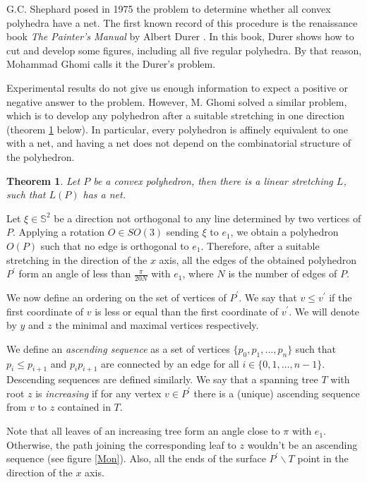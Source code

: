 \documentclass[openright, 12pt]{article}
\newtheorem{teorema}{Theorem}
\begin{document}
G.C. Shephard \cite{Sh} posed in 1975 the problem to determine whether all convex polyhedra have a net. The first known record of this procedure is the renaissance book \textit{The Painter's Manual} by Albert Durer \cite{Du}. In this book, Durer shows how to cut and develop some figures, including all five regular polyhedra. By that reason, Mohammad Ghomi \cite{Gh} calls it the Durer's problem.

Experimental results do not give us enough information to expect a positive or negative answer to the problem. However, M. Ghomi solved a similar problem, which is to develop any polyhedron after a suitable stretching in one direction (theorem \ref{Str} below). In particular, every polyhedron is affinely equivalent to one with a net, and having a net does not depend on the combinatorial structure of the polyhedron. 

\begin{teorema}\label{Str}
{\rm Let $P$ be a convex polyhedron, then there is a linear stretching $L$, such that $L(P)$ has a net.}
\end{teorema}



Let $\xi \in \mathbb{S}^2$ be a direction not orthogonal to any line determined by two vertices of $P$. Applying a rotation $O \in SO(3)$ sending $\xi $ to $e_1 $, we obtain a polyhedron $O(P)$ such that no edge is orthogonal to $e_1$. Therefore, after a suitable stretching in the direction of the $x$ axis, all the edges of the obtained polyhedron $P^{\prime}$  form an angle of less than $\frac{\pi}{20 N}$ with $e_1$, where $N$ is the number of edges of $P$.


We now define an ordering on the set of vertices of $P^{\prime}$. We say that $v \leq v^{\prime}$ if the first coordinate of $v$ is less or equal than the first coordinate of $v^{\prime}$. We will denote by $y$ and $z$ the minimal and maximal vertices respectively.

We define an \textit{ascending sequence} as a set of vertices $\{ p_0, p_1, \ldots , p_n   \}$ such that $p_i \leq p_{i+1}$ and $p_i p_{i+1}$ are connected by an edge for all $i \in \{ 0,1, \ldots, n-1 \} $. Descending sequences are defined similarly. We say that a spanning tree $T$ with root $z$ is \textit{increasing} if for any vertex $v\in P^{\prime}$ there is a (unique) ascending sequence from $v$ to $z$ contained in $T$. 

Note that all leaves of an increasing tree form an angle close to $\pi$ with $e_1$. Otherwise, the path joining the corresponding leaf to $z$ wouldn't be an ascending sequence (see figure \ref{Mon}). Also, all the ends of the surface $P^{\prime} \backslash T$ point in the direction of the $x$ axis.
\end{document}
